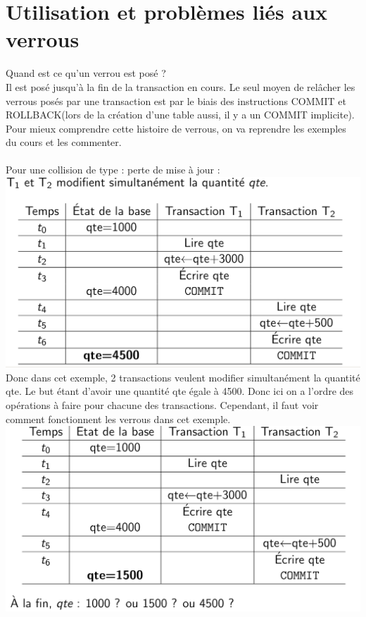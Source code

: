 \documentclass{report}
\begin{document}
\section{Utilisation et problèmes liés aux verrous}
Quand est ce qu'un verrou est posé ?\\
Il est posé jusqu'à la fin de la transaction en cours. Le seul moyen de relâcher les verrous posés par une transaction est par le biais des instructions COMMIT et ROLLBACK(lors de la création d'une table aussi, il y a un COMMIT implicite).\\
Pour mieux comprendre cette histoire de verrous, on va reprendre les exemples du cours et les commenter.\\\\
Pour une collision de type : perte de mise à jour :\\
\includegraphics[scale=0.3]{./Pictures/BD1.PNG}\\
Donc dans cet exemple, 2 transactions veulent modifier simultanément la quantité qte. Le but étant d'avoir une quantité qte égale à 4500. Donc ici on a l'ordre des opérations à faire pour chacune des transactions. Cependant, il faut voir comment fonctionnent les verrous dans cet exemple.\\
\includegraphics[scale=0.3]{./Pictures/BD2.PNG}\\
\end{document}

